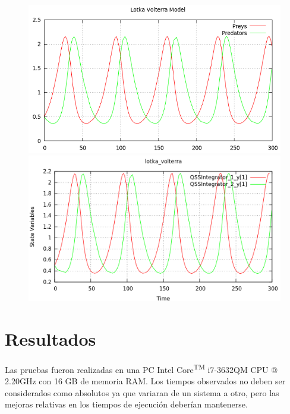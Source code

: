 \begin{figure}[H]
\centering
\begin{minipage}{0.5\textwidth}
\centering
 \includegraphics[width=\linewidth]{lotka_voltera-pd}
\end{minipage}\hfill
\begin{minipage}{0.5\textwidth}
\centering
 \includegraphics[width=\linewidth]{lotka_voltera-qss}
\end{minipage}
\end{figure}

\section{Resultados}

	Las pruebas fueron realizadas en una PC Intel\textsuperscript{\textregistered} Core\textsuperscript{TM} i7-3632QM CPU @ 2.20GHz con 16 GB de memoria RAM. Los tiempos observados no deben ser considerados 
	como absolutos ya que variaran de un sistema a otro, pero las mejoras relativas en los tiempos de ejecución deberían mantenerse.

